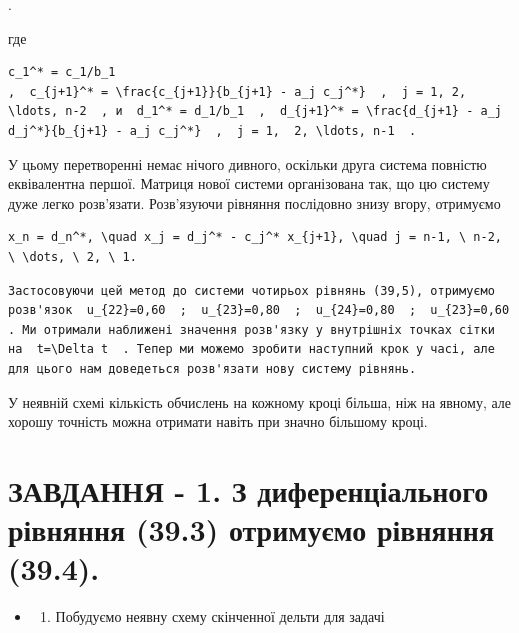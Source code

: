 \documentclass[
  ukrainian,
]{article}
\providecommand{\tightlist}{%
  \setlength{\itemsep}{0pt}\setlength{\parskip}{0pt}}
\begin{document}
.

где

\begin{verbatim}
c_1^* = c_1/b_1
,  c_{j+1}^* = \frac{c_{j+1}}{b_{j+1} - a_j c_j^*}  ,  j = 1, 2, \ldots, n-2  , и  d_1^* = d_1/b_1  ,  d_{j+1}^* = \frac{d_{j+1} - a_j d_j^*}{b_{j+1} - a_j c_j^*}  ,  j = 1,  2, \ldots, n-1  .
\end{verbatim}

У цьому перетворенні немає нічого дивного, оскільки друга система
повністю еквівалентна першої. Матриця нової системи організована так, що
цю систему дуже легко розв'язати. Розв'язуючи рівняння послідовно знизу
вгору, отримуємо

\begin{verbatim}
x_n = d_n^*, \quad x_j = d_j^* - c_j^* x_{j+1}, \quad j = n-1, \ n-2, \ \dots, \ 2, \ 1.
\end{verbatim}

\begin{verbatim}
Застосовуючи цей метод до системи чотирьох рівнянь (39,5), отримуємо розв'язок  u_{22}=0,60  ;  u_{23}=0,80  ;  u_{24}=0,80  ;  u_{23}=0,60  . Ми отримали наближені значення розв'язку у внутрішніх точках сітки на  t=\Delta t  . Тепер ми можемо зробити наступний крок у часі, але для цього нам доведеться розв'язати нову систему рівнянь.
\end{verbatim}

У неявній схемі кількість обчислень на кожному кроці більша, ніж на
явному, але хорошу точність можна отримати навіть при значно більшому
кроці.

\section{ЗАВДАННЯ - 1. З диференціального рівняння (39.3) отримуємо
рівняння
(39.4).}\label{ux437ux430ux432ux434ux430ux43dux43dux44f---1.-ux437-ux434ux438ux444ux435ux440ux435ux43dux446ux456ux430ux43bux44cux43dux43eux433ux43e-ux440ux456ux432ux43dux44fux43dux43dux44f-39.3-ux43eux442ux440ux438ux43cux443ux454ux43cux43e-ux440ux456ux432ux43dux44fux43dux43dux44f-39.4.}

\begin{itemize}
\tightlist
\item
  \begin{enumerate}
  \def\labelenumi{\arabic{enumi}.}
  \setcounter{enumi}{1}
  \tightlist
  \item
    Побудуємо неявну схему скінченної дельти для задачі
  \end{enumerate}
\end{itemize}
\end{document}
